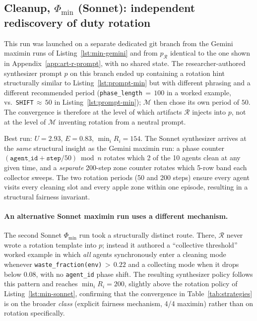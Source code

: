 \documentclass{article}
\newcommand{\cR}{\mathcal{R}}
\newcommand{\cM}{\mathcal{M}}
\begin{document}
\subsection{Cleanup, $\Phi_{\min}$ (Sonnet): independent rediscovery of duty rotation}
\label{app:policy-min-sonnet}

This run was launched on a separate dedicated git branch from the Gemini maximin runs of Listing~\ref{lst:min-gemini} and from $p_\cR$ identical to the one shown in Appendix~\ref{app:art-r-prompt}, with no shared state. The researcher-authored synthesizer prompt $p$ on this branch ended up containing a rotation hint structurally similar to Listing~\ref{lst:prompt-min} but with different phrasing and a different recommended period (\texttt{phase\_length}${\,=\,}100$ in a worked example, vs.\ \texttt{SHIFT}${\,\approx\,}50$ in Listing~\ref{lst:prompt-min}); $\cM$ then chose its own period of $50$. The convergence is therefore at the level of which artifacts $\cR$ injects into $p$, not at the level of $\cM$ inventing rotation from a neutral prompt.

Best run: $U{=}2.93$, $E{=}0.83$, $\min_i R_i{=}154$. The Sonnet synthesizer arrives at the \emph{same} structural insight as the Gemini maximin run: a phase counter $(\texttt{agent\_id} + \texttt{step}/50) \bmod n$ rotates which 2 of the 10 agents clean at any given time, and a \emph{separate} 200-step zone counter rotates which 5-row band each collector sweeps. The two rotation periods (50 and 200 steps) ensure every agent visits every cleaning slot and every apple zone within one episode, resulting in a structural fairness invariant.

\paragraph{An alternative Sonnet maximin run uses a different mechanism.}
The second Sonnet $\Phi_{\min}$ run took a structurally distinct route. There, $\cR$ never wrote a rotation template into $p$; instead it authored a ``collective threshold'' worked example in which \emph{all} agents synchronously enter a cleaning mode whenever \texttt{waste\_fraction(env)}${\,>\,}0.22$ and a collecting mode when it drops below $0.08$, with no \texttt{agent\_id} phase shift. The resulting synthesizer policy follows this pattern and reaches $\min_i R_i {=} 200$, slightly above the rotation policy of Listing~\ref{lst:min-sonnet}, confirming that the convergence in Table~\ref{tab:strategies} is on the broader \emph{class} (explicit fairness mechanism, 4/4 maximin) rather than on rotation specifically.
\end{document}
